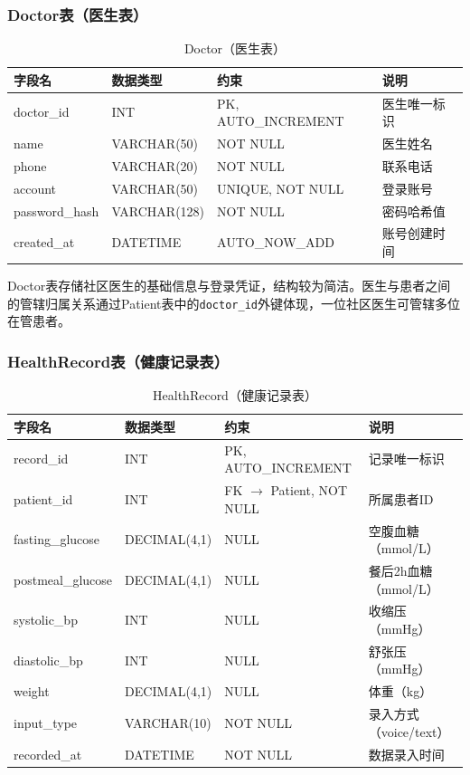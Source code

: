 \subsubsection{Doctor表（医生表）}

\begin{table}[H]
\centering
\caption{Doctor（医生表）}
\label{tab:table-doctor}
\begin{tabularx}{\textwidth}{|l|l|l|X|}
\hline
\textbf{字段名} & \textbf{数据类型} & \textbf{约束} & \textbf{说明} \\
\hline
doctor\_id & INT & PK, AUTO\_INCREMENT & 医生唯一标识 \\
\hline
name & VARCHAR(50) & NOT NULL & 医生姓名 \\
\hline
phone & VARCHAR(20) & NOT NULL & 联系电话 \\
\hline
account & VARCHAR(50) & UNIQUE, NOT NULL & 登录账号 \\
\hline
password\_hash & VARCHAR(128) & NOT NULL & 密码哈希值 \\
\hline
created\_at & DATETIME & AUTO\_NOW\_ADD & 账号创建时间 \\
\hline
\end{tabularx}
\end{table}

Doctor表存储社区医生的基础信息与登录凭证，结构较为简洁。医生与患者之间的管辖归属关系通过Patient表中的\texttt{doctor\_id}外键体现，一位社区医生可管辖多位在管患者。


\subsubsection{HealthRecord表（健康记录表）}

\begin{table}[H]
\centering
\caption{HealthRecord（健康记录表）}
\label{tab:table-healthrecord}
\begin{tabularx}{\textwidth}{|l|l|l|X|}
\hline
\textbf{字段名} & \textbf{数据类型} & \textbf{约束} & \textbf{说明} \\
\hline
record\_id & INT & PK, AUTO\_INCREMENT & 记录唯一标识 \\
\hline
patient\_id & INT & FK $\rightarrow$ Patient, NOT NULL & 所属患者ID \\
\hline
fasting\_glucose & DECIMAL(4,1) & NULL & 空腹血糖（mmol/L） \\
\hline
postmeal\_glucose & DECIMAL(4,1) & NULL & 餐后2h血糖（mmol/L） \\
\hline
systolic\_bp & INT & NULL & 收缩压（mmHg） \\
\hline
diastolic\_bp & INT & NULL & 舒张压（mmHg） \\
\hline
weight & DECIMAL(4,1) & NULL & 体重（kg） \\
\hline
input\_type & VARCHAR(10) & NOT NULL & 录入方式（voice/text） \\
\hline
recorded\_at & DATETIME & NOT NULL & 数据录入时间 \\
\hline
\end{tabularx}
\end{table}

